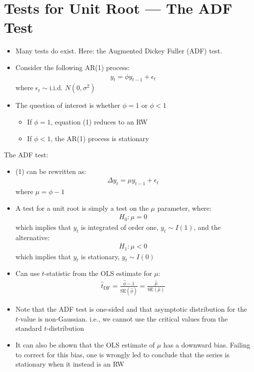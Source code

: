 \documentclass[10pt]{article}
\begin{document}
\section{Tests for Unit Root --- The ADF Test}
\begin{itemize}
    \item Many tests do exist. Here: the Augmented Dickey Fuller (ADF) test. 
    \item Consider the following AR(1) process: 
    \begin{gather}
        y_t = \phi y_{t - 1} + \epsilon_t
    \end{gather}
    where $\epsilon_t \sim \text{i.i.d. }N(0, \sigma^2) $
    \item The question of interest is whether $\phi = 1 \text{ or }\phi < 1 $
    \begin{itemize}
        \item If $\phi = 1 $, equation (1) reduces to an RW 
        \item If $\phi < 1 $, the AR(1) process is stationary
    \end{itemize}
\end{itemize}
The ADF test: 
\begin{itemize}
    \item (1) can be rewritten as: 
    \begin{gather*}
        \Delta y_t = \mu y_{t - 1} + \epsilon_t
    \end{gather*}
    where $\mu = \phi - 1 $
    \item A test for a unit root is simply a test on the $\mu $ parameter, where: 
    \begin{gather*}
        H_0: \mu = 0 
    \end{gather*}
    which implies that $y_t $ is integrated of order one, $y_t\sim I(1) $, and the alternative:
    \begin{gather*}
        H_1 : \mu < 0 
    \end{gather*}
    which implies that $y_t $ is stationary, $y_t\sim I(0) $
    \item Can use $t $-statistic from the OLS estimate for $\mu $:
    \begin{gather*}
        \hat{t}_{\text{DF}} = \frac{\hat{\phi} - 1}{\text{SE}(\hat{\phi})} = \frac{\hat{\mu}}{\text{SE}(\hat{\mu})}
    \end{gather*}
    \item Note that the ADF test is one-sided and that asymptotic distribution for the $t $-value is non-Gaussian. i.e., we cannot use the critical values from the standard $t $-distribution
    \item It can also be shown that the OLS estimate of $\mu $ has a downward bias. Failing to correct for this bias, one is wrongly led to conclude that the series is stationary when it instead is an RW
\end{itemize}
\end{document}
